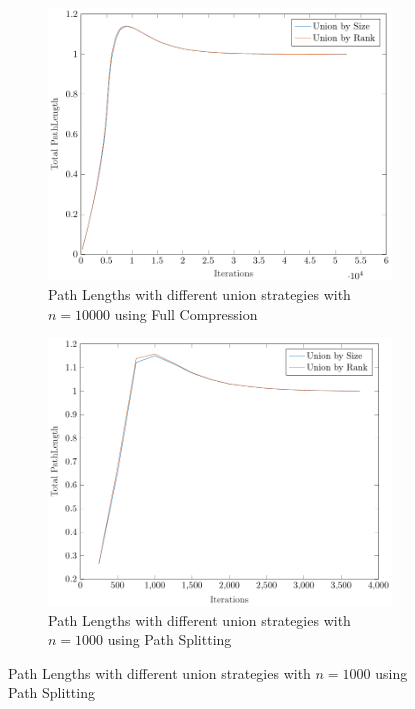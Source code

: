 \begin{figure}[ht]
\begin{subfigure}{0.32\textwidth}
    \end{subfigure}%
    \hfill
    \begin{subfigure}{0.32\textwidth}
        \centering
        \includegraphics[width=\textwidth]{../images/plotFCNonFull10000_PathLength.pdf}
        \caption{Path Lengths with different union strategies with $n = 10000$ using Full Compression}
    \end{subfigure}
    \begin{subfigure}{0.32\textwidth}
        \centering
        \includegraphics[width=\textwidth]{../images/plotPSNonFull1000_PathLength.pdf}
        \caption{Path Lengths with different union strategies with $n = 1000$ using Path Splitting}

\end{subfigure}
\end{figure}
